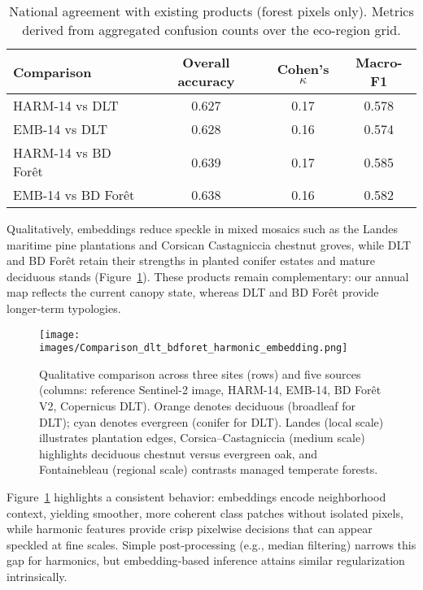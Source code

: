 \documentclass[utf8]{FrontiersinHarvard}
\begin{document}
\begin{table}[H]
    \centering
    \small
    \caption{National agreement with existing products (forest pixels only). Metrics derived from aggregated confusion counts over the eco-region grid.}
    \begin{tabular}{lccc}
        \toprule
        \textbf{Comparison} & \textbf{Overall accuracy} & \textbf{Cohen's $\kappa$} & \textbf{Macro-F1} \\
        \midrule
        HARM-14 vs DLT & 0.627 & 0.17 & 0.578 \\
        EMB-14 vs DLT & 0.628 & 0.16 & 0.574 \\
        HARM-14 vs BD Forêt & 0.639 & 0.17 & 0.585 \\
        EMB-14 vs BD Forêt & 0.638 & 0.16 & 0.582 \\
        \bottomrule
    \end{tabular}
    \label{tab:product_comparison_national}
\end{table}

Qualitatively, embeddings reduce speckle in mixed mosaics such as the Landes maritime pine plantations and Corsican Castagniccia chestnut groves, while DLT and BD Forêt retain their strengths in planted conifer estates and mature deciduous stands (Figure~\ref{fig:comparison_products}). These products remain complementary: our annual map reflects the current canopy state, whereas DLT and BD Forêt provide longer-term typologies.

\begin{figure}[H]
    \centering
    \texttt{[image: images/Comparison\_dlt\_bdforet\_harmonic\_embedding.png]}
    \caption{Qualitative comparison across three sites (rows) and five sources (columns: reference Sentinel-2 image, HARM-14, EMB-14, BD Forêt V2, Copernicus DLT). Orange denotes deciduous (broadleaf for DLT); cyan denotes evergreen (conifer for DLT). Landes (local scale) illustrates plantation edges, Corsica--Castagniccia (medium scale) highlights deciduous chestnut versus evergreen oak, and Fontainebleau (regional scale) contrasts managed temperate forests.}
    \label{fig:comparison_products}
\end{figure}

Figure~\ref{fig:comparison_products} highlights a consistent behavior: embeddings encode neighborhood context, yielding smoother, more coherent class patches without isolated pixels, while harmonic features provide crisp pixelwise decisions that can appear speckled at fine scales. Simple post‑processing (e.g., median filtering) narrows this gap for harmonics, but embedding‑based inference attains similar regularization intrinsically.
\end{document}

